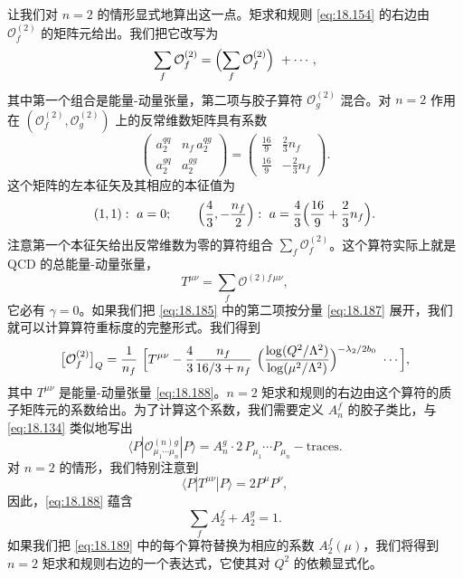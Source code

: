 让我们对 $n = 2$ 的情形显式地算出这一点。矩求和规则 \eqref{eq:18.154} 的右边由 $\mathcal{O}^{(2)}_f$ 的矩阵元给出。我们把它改写为
\begin{equation}
  \sum_f \mathcal{O}^{(2)}_f = \Bigl( \sum_f \mathcal{O}^{(2)}_f \Bigr)\
    + \cdots ,
  \label{eq:18.185}
\end{equation}
其中第一个组合是能量-动量张量，第二项与胶子算符 $\mathcal{O}^{(2)}_g$ 混合。对 $n = 2$ 作用在 $(\mathcal{O}^{(2)}_f, \mathcal{O}^{(2)}_g)$ 上的反常维数矩阵具有系数
\begin{equation}
  \begin{pmatrix}
    a_2^{qq} & n_f\,a_2^{qg}\\
    a_2^{gq} & a_2^{gg}
  \end{pmatrix}
  = \begin{pmatrix}
    \frac{16}{9} & \frac{2}{3}n_f\\
    \frac{16}{9} & -\frac{2}{3}n_f
  \end{pmatrix} .
  \label{eq:18.186}
\end{equation}
这个矩阵的左本征矢及其相应的本征值为
\begin{equation}
  (1, 1):\ a = 0;\qquad
  \Bigl( \frac{4}{3}, -\frac{n_f}{2} \Bigr):\ a = \frac{4}{3}\Bigl(
    \frac{16}{9} + \frac{2}{3}n_f \Bigr) .
  \label{eq:18.187}
\end{equation}
注意第一个本征矢给出反常维数为零的算符组合 $\sum_f\mathcal{O}^{(2)}_f$。这个算符实际上就是 QCD 的总能量-动量张量，
\begin{equation}
  T^{\mu\nu} = \sum_f \mathcal{O}^{(2)f\,\mu\nu} ,
  \label{eq:18.188}
\end{equation}
它必有 $\gamma = 0$。如果我们把 \eqref{eq:18.185} 中的第二项按分量 \eqref{eq:18.187} 展开，我们就可以计算算符重标度的完整形式。我们得到
\begin{equation}
  \bigl[ \mathcal{O}^{(2)}_f \bigr]_Q = \frac{1}{n_f}\ \Bigl[
    T^{\mu\nu} - \frac{4}{3}\frac{n_f}{16/3+n_f}\ \Bigl( \frac{\log(Q^2/
      \Lambda^2)}{\log(\mu^2/\Lambda^2)} \Bigr)^{-\lambda_2/2b_0}\ \cdots
    \Bigr] ,
  \label{eq:18.189}
\end{equation}
其中 $T^{\mu\nu}$ 是能量-动量张量 \eqref{eq:18.188}。$n = 2$ 矩求和规则的右边由这个算符的质子矩阵元的系数给出。为了计算这个系数，我们需要定义 $A_n^f$ 的胶子类比，与 \eqref{eq:18.134} 类似地写出
\begin{equation}
  \langle P|\mathcal{O}^{(n)g}_{\mu_1\cdots\mu_n}|P\rangle
  = A_n^g\cdot 2\,P_{\mu_1}\cdots P_{\mu_n} - \text{traces} .
  \label{eq:18.190}
\end{equation}
对 $n = 2$ 的情形，我们特别注意到
\begin{equation}
  \langle P|T^{\mu\nu}|P\rangle = 2P^\mu P^\nu ,
  \label{eq:18.191}
\end{equation}
因此，\eqref{eq:18.188} 蕴含
\begin{equation}
  \sum_f A_2^f + A_2^g = 1 .
  \label{eq:18.192}
\end{equation}
如果我们把 \eqref{eq:18.189} 中的每个算符替换为相应的系数 $A_2^f(\mu)$，我们将得到 $n = 2$ 矩求和规则右边的一个表达式，它使其对 $Q^2$ 的依赖显式化。

